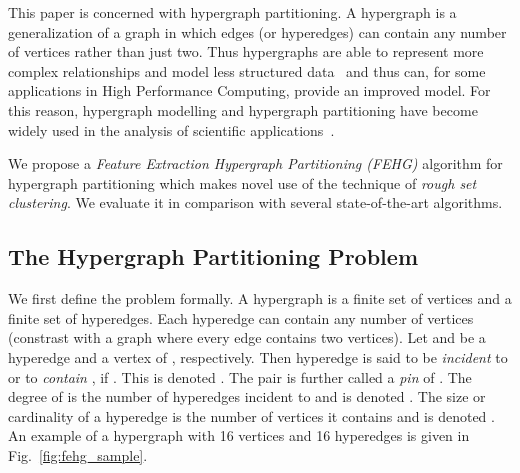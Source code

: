 \documentclass[twocolumn]{svjour3}          \smartqed
\begin{document}
This paper is concerned with hypergraph partitioning.  A hypergraph is a generalization of a graph in which edges (or hyperedges) can contain any number of vertices rather than just two.  Thus hypergraphs are able to represent more complex relationships and model less structured data~\cite{catayk1999,hendrickson1998graph,wang2014bilionnode} and thus can, for some applications in High Performance Computing, provide an improved model.
For this reason, hypergraph modelling and hypergraph partitioning have become widely used in the analysis of scientific applications~\cite{alp1996,catayk1999,curino2010schism,bey2014,hu2014,marquez2015,tian2009,zhou2006learning}. 

We propose a \textit{Feature Extraction Hypergraph Partitioning (FEHG)} algorithm for hypergraph partitioning which makes novel use of the technique of \textit{rough set clustering}.  We evaluate it in comparison with several state-of-the-art algorithms.



\subsection{The Hypergraph Partitioning Problem}\label{sec:hpart_problem}

We first define the problem formally.  A hypergraph  is a finite set of vertices  and a finite set  of hyperedges.  Each hyperedge  can contain any number of vertices (constrast with a graph where every edge contains two vertices). Let  and  be a hyperedge and a vertex of , respectively. Then hyperedge  is said to be \textit{incident} to  or to \textit{contain} , if .  This is denoted . The pair  is further called a \textit{pin} of . The degree of  is the number of hyperedges incident to  and is denoted . The size or cardinality of a hyperedge  is the number of vertices it contains and is denoted . An example of a hypergraph with 16 vertices and 16 hyperedges is given in Fig.~\ref{fig:fehg_sample}.
\end{document}

